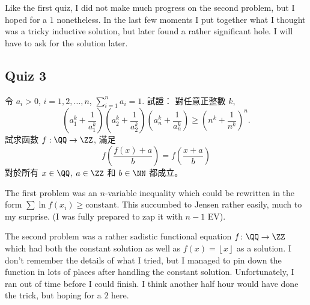 \documentclass[11pt]{scrreprt}
\begin{document}
Like the first quiz, I did not make much progress on the second problem, but I hoped for a $1$ nonetheless. In the last few moments I put together what I thought was a tricky inductive solution, but later found a rather significant hole. I will have to ask for the solution later.

\subsection{Quiz 3}
\begin{enumerate}
  \ii 令 $a_i > 0$,  $i = 1,2,\dots,n$, $\sum_{i=1}^n a_i = 1$.
  試證： 對任意正整數 $k$,
  \[ \left( a_1^k + \frac{1}{a_1^k} \right) \left( a_2^k + \frac{1}{a_2^k} \right)\left( a_n^k + \frac{1}{a_n^k} \right) \ge \left( n^k + \frac{1}{n^k} \right)^n. \]
  \ii 試求函數 $f : \QQ \to \ZZ$, 滿足
  \[ f\left( \frac{f(x)+a}{b} \right) = f\left( \frac{x+a}{b} \right) \]
  對於所有 $x \in \QQ$, $a \in \ZZ$ 和 $b \in \NN$ 都成立。 %
\end{enumerate}
The first problem was an $n$-variable inequality which could be rewritten in the form $\sum \ln f(x_i) \ge \text{constant}$. This succumbed to Jensen rather easily, much to my surprise. (I was fully prepared to zap it with $n-1$ EV).

The second problem was a rather sadistic functional equation $f\colon \QQ \to \ZZ$ which had both the constant solution as well as $f(x) = \left\lfloor x \right\rfloor$ as a solution. I don't remember the details of what I tried, but I managed to pin down the function in lots of places after handling the constant solution. Unfortunately, I ran out of time before I could finish. I think another half hour would have done the trick, but hoping for a $2$ here.
\end{document}
